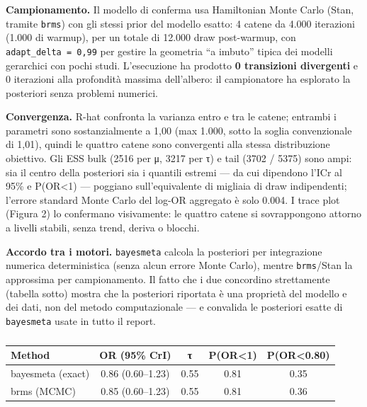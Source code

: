 \documentclass[
  letterpaper,
  DIV=11,
  numbers=noendperiod]{scrartcl}
\begin{document}
\textbf{Campionamento.} Il modello di conferma usa Hamiltonian Monte
Carlo (Stan, tramite \texttt{brms}) con gli stessi prior del modello
esatto: 4 catene da 4.000 iterazioni (1.000 di warmup), per un totale di
12.000 draw post-warmup, con \texttt{adapt\_delta\ =\ 0,99} per gestire
la geometria ``a imbuto'' tipica dei modelli gerarchici con pochi studi.
L'esecuzione ha prodotto \textbf{0 transizioni divergenti} e 0
iterazioni alla profondità massima dell'albero: il campionatore ha
esplorato la posteriori senza problemi numerici.

\textbf{Convergenza.} R-hat confronta la varianza entro e tra le catene;
entrambi i parametri sono sostanzialmente a 1,00 (max 1.000, sotto la
soglia convenzionale di 1,01), quindi le quattro catene sono convergenti
alla stessa distribuzione obiettivo. Gli ESS bulk (2516 per μ, 3217 per
τ) e tail (3702 / 5375) sono ampi: sia il centro della posteriori sia i
quantili estremi --- da cui dipendono l'ICr al 95\% e P(OR\textless1)
--- poggiano sull'equivalente di migliaia di draw indipendenti; l'errore
standard Monte Carlo del log-OR aggregato è solo 0.004. I trace plot
(Figura 2) lo confermano visivamente: le quattro catene si sovrappongono
attorno a livelli stabili, senza trend, deriva o blocchi.

\textbf{Accordo tra i motori.} \texttt{bayesmeta} calcola la posteriori
per integrazione numerica deterministica (senza alcun errore Monte
Carlo), mentre \texttt{brms}/Stan la approssima per campionamento. Il
fatto che i due concordino strettamente (tabella sotto) mostra che la
posteriori riportata è una proprietà del modello e dei dati, non del
metodo computazionale --- e convalida le posteriori esatte di
\texttt{bayesmeta} usate in tutto il report.

{

\begin{longtable}[]{@{}lcccc@{}}

\caption{\label{tbl-confirm-en}}

\tabularnewline

\toprule\noalign{}
Method & OR (95\% CrI) & τ & P(OR\textless1) & P(OR\textless0.80) \\
\midrule\noalign{}
\endhead
\bottomrule\noalign{}
\endlastfoot
bayesmeta (exact) & 0.86 (0.60--1.23) & 0.55 & 0.81 & 0.35 \\
brms (MCMC) & 0.85 (0.60--1.23) & 0.55 & 0.81 & 0.36 \\

\end{longtable}

}
\end{document}
